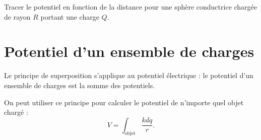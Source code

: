 Tracer le potentiel en fonction de la distance pour une sphère conductrice
chargée de rayon $R$ portant une charge $Q$.



\section{Potentiel d'un ensemble de charges}


Le principe de superposition s'applique au potentiel électrique :
le potentiel d'un ensemble de charges est la somme des potentiels.

On peut utiliser ce principe pour calculer le potentiel de n'importe quel objet
chargé :
\[
  V = \int_\text{objet} \frac{k dq}{r}.
\]






